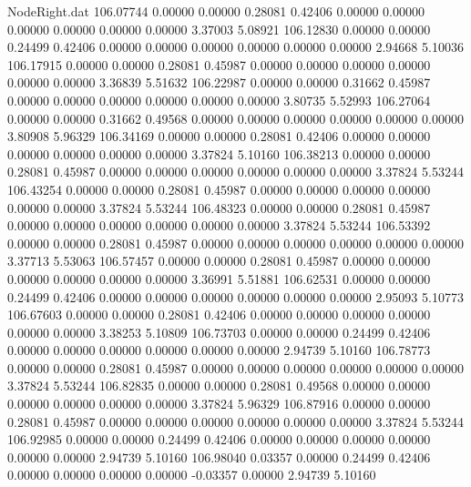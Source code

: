 \begin{filecontents}{NodeRight.dat}
 106.07744    0.00000    0.00000     0.28081    0.42406    0.00000    0.00000    0.00000    0.00000    0.00000    0.00000    3.37003    5.08921
 106.12830    0.00000    0.00000     0.24499    0.42406    0.00000    0.00000    0.00000    0.00000    0.00000    0.00000    2.94668    5.10036
 106.17915    0.00000    0.00000     0.28081    0.45987    0.00000    0.00000    0.00000    0.00000    0.00000    0.00000    3.36839    5.51632
 106.22987    0.00000    0.00000     0.31662    0.45987    0.00000    0.00000    0.00000    0.00000    0.00000    0.00000    3.80735    5.52993
 106.27064    0.00000    0.00000     0.31662    0.49568    0.00000    0.00000    0.00000    0.00000    0.00000    0.00000    3.80908    5.96329
 106.34169    0.00000    0.00000     0.28081    0.42406    0.00000    0.00000    0.00000    0.00000    0.00000    0.00000    3.37824    5.10160
 106.38213    0.00000    0.00000     0.28081    0.45987    0.00000    0.00000    0.00000    0.00000    0.00000    0.00000    3.37824    5.53244
 106.43254    0.00000    0.00000     0.28081    0.45987    0.00000    0.00000    0.00000    0.00000    0.00000    0.00000    3.37824    5.53244
 106.48323    0.00000    0.00000     0.28081    0.45987    0.00000    0.00000    0.00000    0.00000    0.00000    0.00000    3.37824    5.53244
 106.53392    0.00000    0.00000     0.28081    0.45987    0.00000    0.00000    0.00000    0.00000    0.00000    0.00000    3.37713    5.53063
 106.57457    0.00000    0.00000     0.28081    0.45987    0.00000    0.00000    0.00000    0.00000    0.00000    0.00000    3.36991    5.51881
 106.62531    0.00000    0.00000     0.24499    0.42406    0.00000    0.00000    0.00000    0.00000    0.00000    0.00000    2.95093    5.10773
 106.67603    0.00000    0.00000     0.28081    0.42406    0.00000    0.00000    0.00000    0.00000    0.00000    0.00000    3.38253    5.10809
 106.73703    0.00000    0.00000     0.24499    0.42406    0.00000    0.00000    0.00000    0.00000    0.00000    0.00000    2.94739    5.10160
 106.78773    0.00000    0.00000     0.28081    0.45987    0.00000    0.00000    0.00000    0.00000    0.00000    0.00000    3.37824    5.53244
 106.82835    0.00000    0.00000     0.28081    0.49568    0.00000    0.00000    0.00000    0.00000    0.00000    0.00000    3.37824    5.96329
 106.87916    0.00000    0.00000     0.28081    0.45987    0.00000    0.00000    0.00000    0.00000    0.00000    0.00000    3.37824    5.53244
 106.92985    0.00000    0.00000     0.24499    0.42406    0.00000    0.00000    0.00000    0.00000    0.00000    0.00000    2.94739    5.10160
 106.98040    0.03357    0.00000     0.24499    0.42406    0.00000    0.00000    0.00000    0.00000   -0.03357    0.00000    2.94739    5.10160

\end{filecontents}

